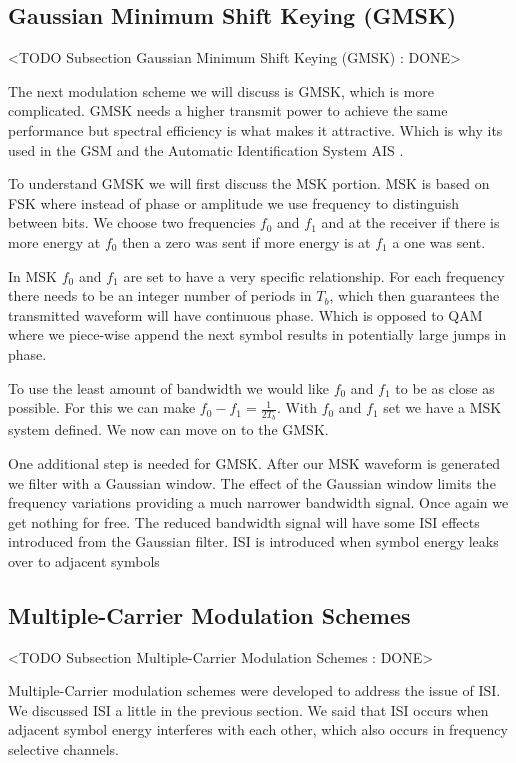 \subsection{Gaussian Minimum Shift Keying (GMSK)}
	<TODO Subsection Gaussian Minimum Shift Keying (GMSK) : DONE>

The next modulation scheme we will discuss is \ac{GMSK}, which is more complicated. \ac{GMSK} needs a higher transmit power to achieve the same performance but spectral efficiency is what makes it attractive. Which is why its used in the \ac{GSM} and the Automatic Identification System \ac{AIS} \cite{}.

To understand \ac{GMSK} we will first discuss the \ac{MSK} portion. \ac{MSK} is based on \ac{FSK} where instead of phase or amplitude we use frequency to distinguish between bits. We choose two frequencies $f_0$ and $f_1$ and at the receiver if there is more energy at $f_0$ then a zero was sent if more energy is at $f_1$ a one was sent.

In \ac{MSK} $f_0$ and $f_1$ are set to have a very specific relationship. For each frequency there needs to be an integer number of periods in $T_b$, which then guarantees the transmitted waveform will have continuous phase. Which is opposed to \ac{QAM} where we piece-wise append the next symbol results in potentially large jumps in phase.

To use the least amount of bandwidth we would like $f_0$ and $f_1$ to be as close as possible. For this we can make $f_0-f_1=\frac{1}{2T_b}$. With $f_0$ and $f_1$ set we have a \ac{MSK} system defined. We now can move on to the \ac{GMSK}.

One additional step is needed for \ac{GMSK}. After our \ac{MSK} waveform is generated we filter with a Gaussian window. The effect of the Gaussian window limits the frequency variations providing a much narrower bandwidth signal. Once again we get nothing for free. The reduced bandwidth signal will have some \ac{ISI} effects introduced from the Gaussian filter. \ac{ISI} is introduced when symbol energy leaks over to adjacent symbols \cite{Skl01}

	
	
\subsection{Multiple-Carrier Modulation Schemes}
	<TODO Subsection Multiple-Carrier Modulation Schemes : DONE>

Multiple-Carrier modulation schemes were developed to address the issue of \ac{ISI}. We discussed \ac{ISI} a little in the previous section. We said that \ac{ISI} occurs when adjacent symbol energy interferes with each other, which also occurs in frequency selective channels.

